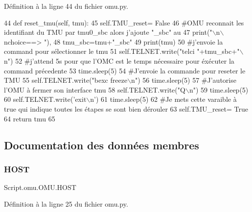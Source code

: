 Définition à la ligne 44 du fichier omu.\+py.


\begin{DoxyCode}
44     \textcolor{keyword}{def }reset\_tmu(self, tmu):
45         self.TMU\_reset= \textcolor{keyword}{False}
46         \textcolor{comment}{#OMU reconnait les identifiant du TMU par tmu0\_sbc alors j'ajoute "\_sbc" au
}
47         print(\textcolor{stringliteral}{"\(\backslash\)n\(\backslash\)nchoice==> "}),
48         tmu\_sbc=tmu+\textcolor{stringliteral}{"\_sbc"}
49         print(tmu)
50         \textcolor{comment}{#j'envoie la command pour sélectionner le tmu
}
51         self.TELNET.write(\textcolor{stringliteral}{"telci "}+tmu\_sbc+\textcolor{stringliteral}{"\(\backslash\)n"})
52         \textcolor{comment}{#j'attend 5s pour que l'OMC est le temps nécessaire pour éxécuter la command précedente
}
53         time.sleep(5)
54         \textcolor{comment}{#J'envoie la commande pour reseter le TMU
}
55         self.TELNET.write(\textcolor{stringliteral}{"bexc freeze\(\backslash\)n"})
56         time.sleep(5)
57         \textcolor{comment}{#J'autorise l'OMU à fermer son interface tmu
}
58         self.TELNET.write(\textcolor{stringliteral}{"Q\(\backslash\)n"})
59         time.sleep(5)
60         self.TELNET.write(\textcolor{stringliteral}{'exit\(\backslash\)n'})
61         time.sleep(5)
62         \textcolor{comment}{#Je mets cette varaible à true qui indique toutes les étapes se sont bien dérouler
}
63         self.TMU\_reset= \textcolor{keyword}{True}
64         \textcolor{keywordflow}{return} tmu
65 
\end{DoxyCode}


\subsection{Documentation des données membres}
\mbox{\label{classScript_1_1omu_1_1OMU_a7ab79fab99cb1987d8826b5a715c61e5}} 
\subsubsection{\texorpdfstring{H\+O\+ST}{HOST}}
{\footnotesize\ttfamily Script.\+omu.\+O\+M\+U.\+H\+O\+ST}



Définition à la ligne 25 du fichier omu.\+py.

